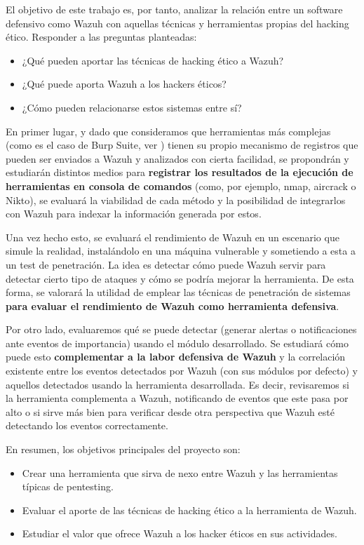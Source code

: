 El objetivo de este trabajo es, por tanto, analizar la relación entre un software defensivo como Wazuh con aquellas técnicas y herramientas propias del hacking ético. Responder a las preguntas planteadas:

\begin{itemize}
    \item ¿Qué pueden aportar las técnicas de hacking ético a Wazuh?
    \item ¿Qué puede aporta Wazuh a los hackers éticos?
    \item ¿Cómo pueden relacionarse estos sistemas entre sí?
\end{itemize}

En primer lugar, y dado que consideramos que herramientas más complejas (como es el caso de Burp Suite, ver \cite{burp}) tienen su propio mecanismo de registros que pueden ser enviados a Wazuh y analizados con cierta facilidad, se propondrán y estudiarán distintos medios para \textbf{registrar los resultados de la ejecución de herramientas en consola de comandos} (como, por ejemplo, nmap, aircrack o Nikto), se evaluará la viabilidad de cada método y la posibilidad de integrarlos con Wazuh para indexar la información generada por estos.

Una vez hecho esto, se evaluará el rendimiento de Wazuh en un escenario que simule la realidad, instalándolo en una máquina vulnerable y sometiendo a esta a un test de penetración. La idea es detectar cómo puede Wazuh servir para detectar cierto tipo de ataques y cómo se podría mejorar la herramienta. De esta forma, se valorará la utilidad de emplear las técnicas de penetración de sistemas \textbf{para evaluar el rendimiento de Wazuh como herramienta defensiva}.

Por otro lado, evaluaremos qué se puede detectar (generar alertas o notificaciones ante eventos de importancia) usando el módulo desarrollado. Se estudiará cómo puede esto \textbf{complementar a la labor defensiva de Wazuh} y la correlación existente entre los eventos detectados por Wazuh (con sus módulos por defecto) y aquellos detectados usando la herramienta desarrollada. Es decir, revisaremos si la herramienta complementa a Wazuh, notificando de eventos que este pasa por alto o si sirve más bien para verificar desde otra perspectiva que Wazuh esté detectando los eventos correctamente.

En resumen, los objetivos principales del proyecto son:

\begin{itemize}
    \item Crear una herramienta que sirva de nexo entre Wazuh y las herramientas típicas de pentesting.
    \item Evaluar el aporte de las técnicas de hacking ético a la herramienta de Wazuh.
    \item Estudiar el valor que ofrece Wazuh a los hacker éticos en sus actividades.
\end{itemize}


